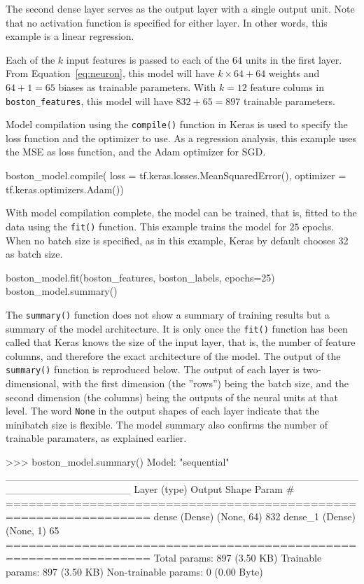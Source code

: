 The second dense layer serves as the output layer with a single output unit. Note that no activation function is specified for either layer. In other words, this example is a linear regression.

Each of the $k$ input features is passed to each of the 64 units in the first layer. From Equation~\ref{eq:neuron}, this model will have $k \times 64 + 64$ weights and $64 + 1 = 65$ biases as trainable parameters. With $k=12$ feature colums in \texttt{boston\_features}, this model will have $832 + 65 = 897$ trainable parameters. 

Model compilation using the \texttt{compile()} function in Keras is used to specify the loss function and the optimizer to use. As a regression analysis, this example uses the MSE as loss function, and the Adam optimizer for SGD.

\begin{pythoncode}
boston_model.compile(
    loss = tf.keras.losses.MeanSquaredError(),
    optimizer = tf.keras.optimizers.Adam())
\end{pythoncode}

With model compilation complete, the model can be trained, that is, fitted to the data using the \texttt{fit()} function. This example trains the model for $25$ epochs. When no batch size is specified, as in this example, Keras by default chooses 32 as batch size.

\begin{pythoncode}
boston_model.fit(boston_features, boston_labels, epochs=25)
boston_model.summary()
\end{pythoncode}

The \texttt{summary()} function does not show a summary of training results but a summary of the model architecture. It is only once the \texttt{fit()} function has been called that Keras knows the size of the input layer, that is, the number of feature columns, and therefore the exact architecture of the model. The output of the \texttt{summary()} function is reproduced below. The output of each layer is two-dimensional, with the first dimension (the ''rows'') being the batch size, and the second dimension (the columns) being the outputs of the neural units at that level. The word \texttt{None} in the output shapes of each layer indicate that the minibatch size is flexible. The model summary also confirms the number of trainable paramaters, as explained earlier.

\begin{textcode}
>>> boston_model.summary()
Model: "sequential"
_________________________________________________________________
 Layer (type)                Output Shape              Param #   
=================================================================
 dense (Dense)               (None, 64)                832       
 dense_1 (Dense)             (None, 1)                 65        
=================================================================
Total params: 897 (3.50 KB)
Trainable params: 897 (3.50 KB)
Non-trainable params: 0 (0.00 Byte)
\end{textcode}

